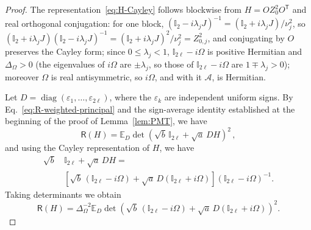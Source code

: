 \documentclass[prx,twocolumn,superscriptaddress,aps,10pt, frontmatterverbose, reprint,footinbib,longbibliography=true]{revtex4-2}
\newcommand{\trans}{\mathsf{T}}
\begin{document}
\begin{proof}
The representation~\eqref{eq:H-Cayley} follows blockwise from $H=OZ_0^2O^{\trans}$ and real orthogonal conjugation: for one block, $(\mathbb{I}_2-i\lambda_jJ)^{-1}=(\mathbb{I}_2+i\lambda_jJ)/\nu_j^2$, so $(\mathbb{I}_2+i\lambda_jJ)(\mathbb{I}_2-i\lambda_jJ)^{-1}=(\mathbb{I}_2+i\lambda_jJ)^2/\nu_j^2=Z_{0,j}^2$, and conjugating by $O$ preserves the Cayley form; since $0\le\lambda_j<1$, $\mathbb{I}_{2\ell}-i\Omega$ is positive Hermitian and $\Delta_\Omega>0$ (the eigenvalues of $i\Omega$ are $\pm\lambda_j$, so those of $\mathbb{I}_{2\ell}-i\Omega$ are $1\mp\lambda_j>0$); moreover $\Omega$ is real antisymmetric, so $i\Omega$, and with it $\mathcal{A}$, is Hermitian. 

Let $D=\operatorname{diag}(\varepsilon_1,\ldots,\varepsilon_{2\ell})$,
where the $\varepsilon_k$ are independent uniform signs. By Eq.~\eqref{eq:R-weighted-principal} and the sign-average identity established at the beginning of the proof of Lemma~\ref{lem:PMT}, we have
\begin{equation}
\mathsf{R}(H)
=
\mathbb{E}_D
\det\!\left(\sqrt{b}\,\mathbb{I}_{2\ell}+\sqrt{a}\,DH\right)^2\,,
\label{eq:R-sign-average}
\end{equation}
and using the Cayley representation of $H$, we have
\begin{equation}
    \begin{split}
\sqrt{b}\,&\mathbb{I}_{2\ell}+\sqrt{a}\,DH
=\\&
\left[
\sqrt{b}\,(\mathbb{I}_{2\ell}-i\Omega)
+\sqrt{a}\,D(\mathbb{I}_{2\ell}+i\Omega)
\right]
(\mathbb{I}_{2\ell}-i\Omega)^{-1}.
\end{split}
\end{equation}
Taking determinants we obtain
\begin{equation}
\mathsf{R}(H)
=
\Delta_\Omega^{-2}
\mathbb{E}_D
\det\!\left(
\sqrt{b}\,(\mathbb{I}_{2\ell}-i\Omega)
+\sqrt{a}\,D(\mathbb{I}_{2\ell}+i\Omega)
\right)^2.
\label{eq:R-Cayley-average}
\end{equation}


\end{proof}
\end{document}
